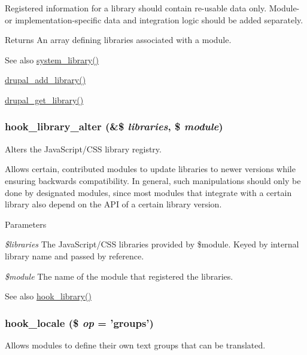 Registered information for a library should contain re-\/usable data only. Module-\/ or implementation-\/specific data and integration logic should be added separately.

\begin{DoxyReturn}{Returns}
An array defining libraries associated with a module.
\end{DoxyReturn}
\begin{DoxySeeAlso}{See also}
\hyperlink{system_8module_a7f680fce0aaf48a96f122edf5345097f}{system\_\-library()} 

\hyperlink{common_8inc_a10d0b7349429391743b9ffc49b48908a}{drupal\_\-add\_\-library()} 

\hyperlink{common_8inc_aa535ac5edd443308d3b2812caf1a1b85}{drupal\_\-get\_\-library()} 
\end{DoxySeeAlso}
\hypertarget{group__hooks_ga7256c50068666c9c02f43a08efcefae7}{
\subsubsection[{hook\_\-library\_\-alter}]{\setlength{\rightskip}{0pt plus 5cm}hook\_\-library\_\-alter (\&\$ {\em libraries}, \/  \$ {\em module})}}
\label{group__hooks_ga7256c50068666c9c02f43a08efcefae7}
Alters the JavaScript/CSS library registry.

Allows certain, contributed modules to update libraries to newer versions while ensuring backwards compatibility. In general, such manipulations should only be done by designated modules, since most modules that integrate with a certain library also depend on the API of a certain library version.


\begin{DoxyParams}{Parameters}
\item[{\em \$libraries}]The JavaScript/CSS libraries provided by \$module. Keyed by internal library name and passed by reference. \item[{\em \$module}]The name of the module that registered the libraries.\end{DoxyParams}
\begin{DoxySeeAlso}{See also}
\hyperlink{group__hooks_ga6bf3f83fa2e373836f5aa78fd143d1cd}{hook\_\-library()} 
\end{DoxySeeAlso}
\hypertarget{group__hooks_ga7d8968676deb891e4838c2d3173de7f6}{
\subsubsection[{hook\_\-locale}]{\setlength{\rightskip}{0pt plus 5cm}hook\_\-locale (\$ {\em op} = {\ttfamily 'groups'})}}
\label{group__hooks_ga7d8968676deb891e4838c2d3173de7f6}
Allows modules to define their own text groups that can be translated.


